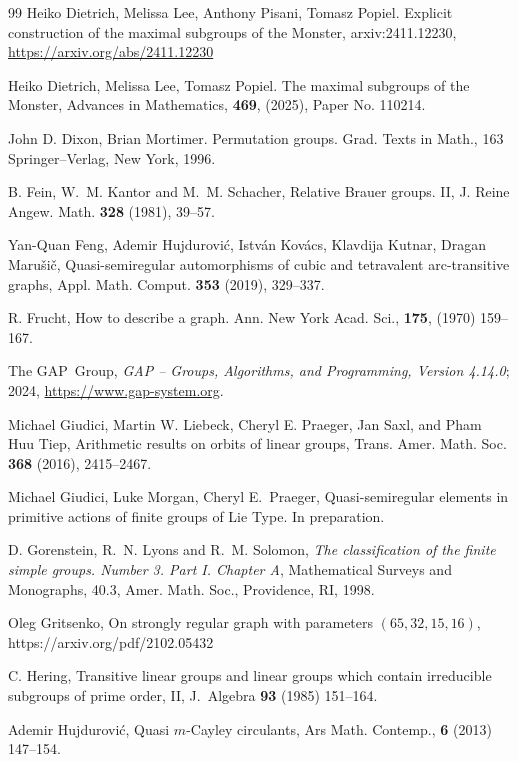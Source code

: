 \documentclass{article}
\theoremstyle{remark}
\theoremstyle{definition}
\begin{document}
\begin{thebibliography}{99}
Heiko Dietrich, Melissa Lee, Anthony Pisani, Tomasz Popiel.
Explicit construction of the maximal subgroups of the Monster, arxiv:2411.12230, \url{https://arxiv.org/abs/2411.12230}

Heiko Dietrich, Melissa Lee, Tomasz Popiel.
The maximal subgroups of the Monster, Advances in Mathematics, {\bf 469}, (2025), Paper No. 110214.

John D. Dixon, Brian Mortimer.
Permutation groups. Grad. Texts in Math., 163 Springer--Verlag, New York, 1996.


B. Fein, W.~M. Kantor and M.~M. Schacher, Relative Brauer groups. II, J. Reine Angew. Math. {\bf 328} (1981), 39--57.

Yan-Quan Feng,  Ademir Hujdurovi\'c,  Istv\'an  Kov\'acs,  Klavdija  Kutnar,   Dragan Maru\v si\v c,
Quasi-semiregular automorphisms of cubic and tetravalent arc-transitive graphs, Appl. Math. Comput. {\bf 353} (2019), 329--337.

R. Frucht,   How to describe a graph. Ann. New York Acad. Sci., {\bf 175}, (1970) 159--167.


  The GAP~Group, \emph{GAP -- Groups, Algorithms, and Programming, 
  Version 4.14.0}; 
  2024,
  \url{https://www.gap-system.org}.


Michael Giudici, Martin W. Liebeck, Cheryl E. Praeger, Jan Saxl, and Pham Huu Tiep, Arithmetic results on orbits of linear groups, Trans. Amer. Math. Soc. \textbf{368} (2016),  2415--2467.

Michael Giudici, Luke Morgan, Cheryl E.~Praeger, Quasi-semiregular elements in primitive actions of finite groups of Lie Type. In preparation.


D. Gorenstein, R.~N. Lyons and R.~M. Solomon, {\it The classification of the finite simple groups. Number 3. Part I. Chapter A}, Mathematical Surveys and Monographs, 40.3, Amer. Math. Soc., Providence, RI, 1998.


Oleg Gritsenko, On strongly regular graph with parameters
{$(65, 32, 15, 16)$}, https://arxiv.org/pdf/2102.05432

C. Hering, Transitive linear groups and linear groups which contain irreducible subgroups of prime
order, II, J.~Algebra {\bf93} (1985) 151--164.


Ademir Hujdurovi\'{c}, Quasi {$m$}-Cayley circulants, Ars Math. Contemp., {\bf 6} (2013) 147--154.




\end{thebibliography}
\end{document}
